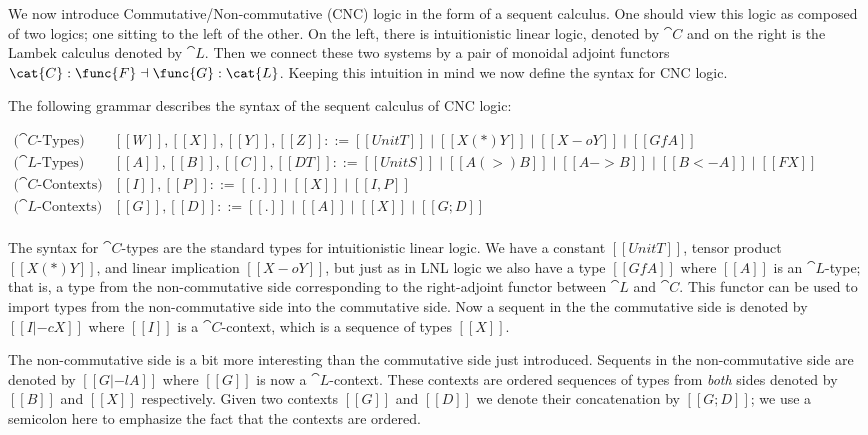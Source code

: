 We now introduce Commutative/Non-commutative (CNC) logic in the form of a
sequent calculus. One should view this logic as composed of two logics; one
sitting to the left of the other. On the left, there is intuitionistic
linear logic, denoted by $\cat{C}$ and on the right is the Lambek calculus
denoted by $\cat{L}$. Then we connect these two systems by a pair of
monoidal adjoint functors $\cat{C} : \func{F} \dashv \func{G} : \cat{L}$.
Keeping this intuition in mind we now define the syntax for CNC logic.

\begin{definition}
  \label{def:Lambek-syntax}
  The following grammar describes the syntax of the sequent calculus of
  CNC logic:
  \begin{center}\vspace{-3px}\small
    \begin{math}
      \begin{array}{lll}
        \text{($\cat{C}$-Types)} & [[W]],[[X]],[[Y]],[[Z]] ::= [[UnitT]] \mid [[X (*) Y]] \mid [[X -o Y]] \mid [[Gf A]]\\
        \text{($\cat{L}$-Types)} & [[A]],[[B]],[[C]],[[DT]] ::= [[UnitS]] \mid [[A (>) B]] \mid [[A -> B]] \mid [[B <- A]] \mid [[F X]]\\
        \text{($\cat{C}$-Contexts)} & [[I]],[[P]] ::= [[.]] \mid [[X]] \mid [[I,P]]\\
        \text{($\cat{L}$-Contexts)} & [[G]],[[D]] ::= [[.]] \mid [[A]] \mid [[X]] \mid [[G;D]]\\
      \end{array}
    \end{math}
  \end{center}
\end{definition}

The syntax for $\cat{C}$-types are the standard types for intuitionistic
linear logic. We have a constant $[[UnitT]]$, tensor product $[[X (*) Y]]$,
and linear implication $[[X -o Y]]$, but just as in LNL logic we also have a
type $[[Gf A]]$ where $[[A]]$ is an $\cat{L}$-type; that is, a type from the
non-commutative side corresponding to the right-adjoint functor between
$\cat{L}$ and $\cat{C}$. This functor can be used to import types from the
non-commutative side into the commutative side. Now a sequent in the the
commutative side is denoted by $[[I |-c X]]$ where $[[I]]$ is a
$\cat{C}$-context, which is a sequence of types $[[X]]$.

The non-commutative side is a bit more interesting than the commutative side
just introduced. Sequents in the non-commutative side are denoted by
$[[G |-l A]]$ where $[[G]]$ is now a $\cat{L}$-context. These contexts are
ordered sequences of types from \emph{both} sides denoted by $[[B]]$ and
$[[X]]$ respectively. Given two contexts $[[G]]$ and $[[D]]$ we denote their
concatenation by $[[G;D]]$; we use a semicolon here to emphasize the fact
that the contexts are ordered.


